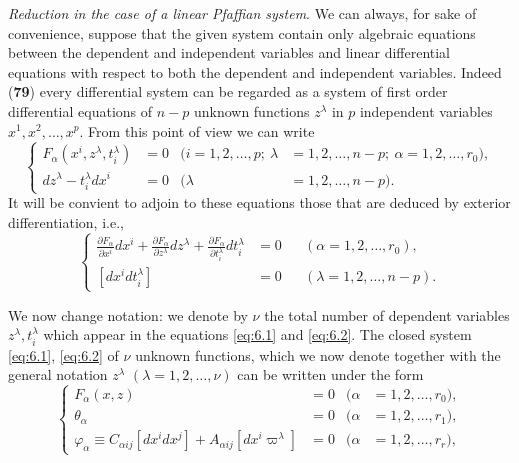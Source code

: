 \documentclass[leqno,11pt]{book}
\numberwithin{equation}{chapter}
\newcommand{\pd}{\partial}
\theoremstyle{shape1}
\theoremstyle{shape0}
\theoremstyle{shape2}
\theoremstyle{definition}
\begin{document}
\vspace{12pt}\fsec \emph{Reduction in the case of a linear Pfaffian system}. We can always, for sake of convenience, suppose that the given system contain only algebraic equations between the dependent and independent variables and linear differential equations with respect to both the dependent and independent variables. Indeed (\textsection\textbf{79}) every differential system can be regarded as a system of first order differential equations of $n-p$ unknown functions $z^{\lambda}$ in $p$ independent variables $x^{1},x^{2},\dots,x^{p}$. From this point of view we can write
\begin{equation}
  \label{eq:6.1}
  \left\{
    \begin{aligned}
      F_{\alpha}(x^{i},z^{\lambda},t_{i}^{\lambda})&=0&(i=1,2,\dots,p;\ \lambda&=1,2,\dots,n-p;\ \alpha=1,2,\dots,r_{0}),\\
      dz^{\lambda}-t_{i}^{\lambda}dx^{i}&=0&(\lambda&=1,2,\dots,n-p).
    \end{aligned}
  \right.
\end{equation}
It will be convient to adjoin to these equations those that are deduced by exterior differentiation, i.e.,
\begin{equation}
  \label{eq:6.2}
  \left\{
    \begin{aligned}
      \frac{\pd F_{\alpha}}{\pd x^{i}}dx^{i}+\frac{\pd F_{\alpha}}{\pd z^{\lambda}}dz^{\lambda}+\frac{\pd F_{\alpha}}{\pd t_{i}^{\lambda}}dt_{i}^{\lambda}&=0&&(\alpha=1,2,\dots,r_{0}),\\
    [dx^{i}dt_{i}^{\lambda}]&=0&&(\lambda=1,2,\dots,n-p).
  \end{aligned}
  \right.
\end{equation}

We now change notation: we denote by $\nu$ the total number of dependent variables $z^{\lambda}, t_{i}^{\lambda}$ which appear in the equations \eqref{eq:6.1} and \eqref{eq:6.2}. The closed system \eqref{eq:6.1}, \eqref{eq:6.2} of $\nu$ unknown functions, which we now denote together with the general notation $z^{\lambda}$ $(\lambda=1,2,\dots,\nu)$ can be written under the form
\begin{equation}
  \label{eq:6.3}
  \left\{
    \begin{aligned}
      F_{\alpha}(x,z)&=0&(\alpha&=1,2,\dots,r_{0}),\\
      \theta_{\alpha}&=0&(\alpha&=1,2,\dots,r_{1}),\\
      \varphi_{\alpha}\equiv C_{\alpha ij}[dx^{i}dx^{j}]+A_{\alpha ij}[dx^{i}\varpi^{\lambda}]&=0&(\alpha&=1,2,\dots,r_{r}),
    \end{aligned}
  \right.
\end{equation}
\end{document}
